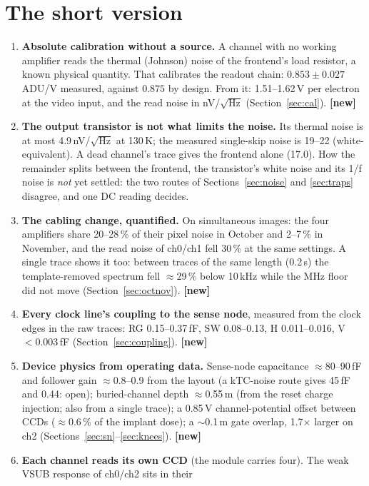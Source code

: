 \documentclass[11pt]{article}
\newcommand{\novel}{\textcolor{blue!60!black}{\textbf{[new]}}}
\begin{document}
\section{The short version}
\begin{enumerate}
\item \textbf{Absolute calibration without a source.} A channel with no working amplifier reads the thermal (Johnson)
  noise of the frontend's load resistor, a known physical quantity. That calibrates the readout chain: $0.853\pm0.027$
  ADU/\textmu V measured, against $0.875$ by design. From it: 1.51--1.62\,\textmu V per electron at the video input,
  and the read noise in nV/$\sqrt{\text{Hz}}$ (Section~\ref{sec:cal}). \novel
\item \textbf{The output transistor is not what limits the noise.} Its thermal noise is at most 4.9\,nV/$\sqrt{\text{Hz}}$
  at 130\,K; the measured single-skip noise is 19--22 (white-equivalent). A dead channel's trace gives the frontend alone
  (17.0). How the remainder splits between the frontend, the transistor's white noise and its 1/f noise is \emph{not} yet
  settled: the two routes of Sections~\ref{sec:noise} and \ref{sec:traps} disagree, and one DC reading decides.
\item \textbf{The cabling change, quantified.} On simultaneous images: the four amplifiers share 20--28\,\% of their
  pixel noise in October and 2--7\,\% in November, and the read noise of ch0/ch1 fell 30\,\% at the same settings. A
  single trace shows it too: between traces of the same length (0.2\,s) the template-removed spectrum fell
  $\approx$29\,\% below 10\,kHz while the MHz floor did not move (Section~\ref{sec:octnov}). \novel
\item \textbf{Every clock line's coupling to the sense node}, measured from the clock edges in the raw traces: RG
  0.15--0.37\,fF, SW 0.08--0.13, H 0.011--0.016, V $<0.003$\,fF (Section~\ref{sec:coupling}). \novel
\item \textbf{Device physics from operating data.} Sense-node capacitance $\approx$80--90\,fF and follower gain
  $\approx$0.8--0.9 from the layout (a kTC-noise route gives 45\,fF and 0.44: open); buried-channel depth $\approx$0.55\,\textmu m (from the reset charge injection; also from a single trace); a 0.85\,V
  channel-potential offset between CCDs ($\approx$0.6\,\% of the implant dose); a $\sim$0.1\,\textmu m gate overlap,
  1.7$\times$ larger on ch2 (Sections~\ref{sec:sn}--\ref{sec:knees}). \novel
\item \textbf{Each channel reads its own CCD} (the module carries four). The weak VSUB response of ch0/ch2 sits in their

\end{enumerate}
\end{document}
